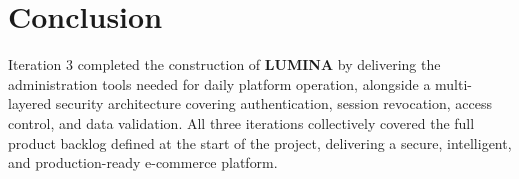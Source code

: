 \section*{Conclusion}
Iteration 3 completed the construction of \textbf{LUMINA} by delivering the
administration tools needed for daily platform operation, alongside a
multi-layered security architecture covering authentication, session revocation,
access control, and data validation.
All three iterations collectively covered the full product backlog defined at
the start of the project, delivering a secure, intelligent, and production-ready
e-commerce platform.
